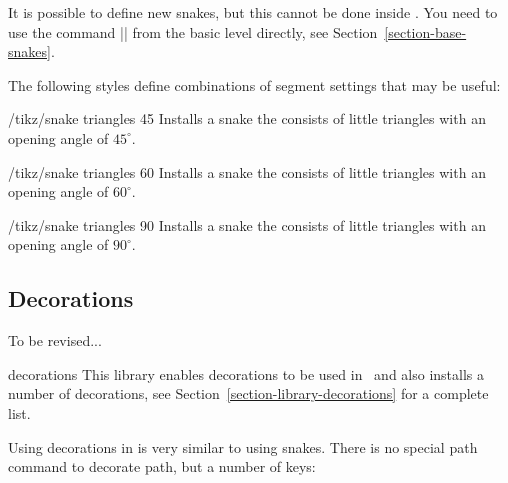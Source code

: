 It is possible to define new snakes, but this cannot be done inside
\tikzname. You need to use the command |\pgfdeclaresnake| from the
basic level directly, see Section~\ref{section-base-snakes}.

The following styles define combinations of segment settings that may
be useful:
\begin{stylekey}{/tikz/snake triangles 45}
  Installs a snake the consists of little triangles with an opening
  angle of $45^\circ$.
\end{stylekey}

\begin{stylekey}{/tikz/snake triangles 60}
  Installs a snake the consists of little triangles with an opening
  angle of $60^\circ$.
\end{stylekey}

\begin{stylekey}{/tikz/snake triangles 90}
  Installs a snake the consists of little triangles with an opening
  angle of $90^\circ$.
\end{stylekey}




\subsection{Decorations}

To be revised...

\begin{tikzlibrary}{decorations}
  This library enables decorations to be used in \tikzname\ and also
  installs a number of decorations, see
  Section~\ref{section-library-decorations} for a complete list.
\end{tikzlibrary}

Using decorations in \tikzname{} is very similar to using snakes.
There is no special path command to decorate path, but a number of
keys:

